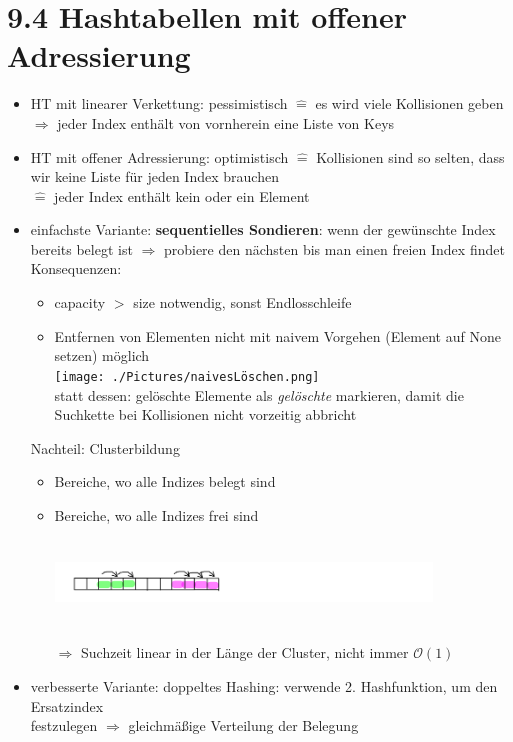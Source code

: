 \documentclass[11pt, fleqn]{scrreprt}
\begin{document}
\section*{9.4 Hashtabellen mit offener Adressierung}
\begin{itemize}
	\item HT mit linearer Verkettung: pessimistisch $\widehat{=}$ es wird viele Kollisionen geben\\ \hspace*{3cm}$\Rightarrow$ jeder Index enthält von vornherein eine Liste von Keys
	\item HT mit offener Adressierung: optimistisch $\widehat{=}$ Kollisionen sind so selten, dass wir keine Liste für jeden Index brauchen\\ \hspace*{3cm}$\widehat{=}$ jeder Index enthält kein oder ein Element
	\item einfachste Variante: \textbf{sequentielles Sondieren}: wenn der gewünschte Index bereits belegt ist $\Rightarrow$ probiere den nächsten bis man einen freien Index findet \\
	Konsequenzen:
	\begin{itemize}
		\item capacity $>$ size notwendig, sonst Endlosschleife
		\item Entfernen von Elementen nicht mit naivem Vorgehen (Element auf None setzen) möglich\\
		\texttt{[image: ./Pictures/naivesLöschen.png]}\\
		statt dessen: gelöschte Elemente als \emph{gelöschte} markieren, damit die Suchkette bei Kollisionen nicht vorzeitig abbricht
	\end{itemize}
	Nachteil: Clusterbildung
	\begin{itemize}
		\item Bereiche, wo alle Indizes belegt sind
		\item Bereiche, wo alle Indizes frei sind\\
		\includegraphics[width=10cm,height=3cm,keepaspectratio]{./Pictures/buntesArray.png}\\
		$\Rightarrow$ Suchzeit linear in der Länge der Cluster, nicht immer $\mathcal{O}(1)$
	\end{itemize}
	\item verbesserte Variante: doppeltes Hashing: verwende 2. Hashfunktion, um den Ersatzindex\\ \hspace*{5mm}festzulegen $\Rightarrow$ gleichmäßige Verteilung der Belegung
\end{itemize}
\end{document}
